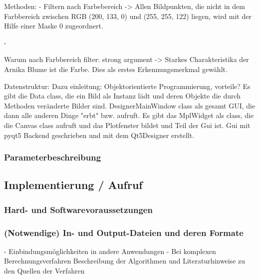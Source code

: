 Methoden: 
- Filtern nach Farbebereich ->
Allen Bildpunkten, die nicht in dem Farbbereich zwischen RGB (200, 133, 0) und (255, 255, 122) liegen, wird mit der Hilfe einer Maske 0 zugeordnert. 

- 

Warum nach Farbbereich filter:
strong argument -> Starkes Charakteristika der Arnika Blume ist die Farbe. Dies als erstes Erkennungsmerkmal gewählt.


Datenstruktur:
Dazu einleitung: Objektorientierte Programmierung, vorteile?
Es gibt die Data class, die ein Bild als Instanz lädt und deren Objekte die durch Methoden veränderte Bilder sind. 
DesignerMainWindow class als gesamt GUI, die dann alle anderen Dinge "erbt" bzw. aufruft.
Es gibt das MplWidget als class, die die Canvas class aufruft und das Plotfenster bildet und Teil der Gui ist. 
Gui mit pyqt5 Backend geschrieben und mit dem Qt5Designer erstellt.

\subsubsection{Parameterbeschreibung}


\subsection{Implementierung / Aufruf}    




\subsubsection{Hard- und Softwarevoraussetzungen}
\subsubsection{(Notwendige) In- und Output-Dateien und deren Formate}



- Einbindungsmöglichkeiten in andere Anwendungen
- Bei komplexen Berechnungsverfahren Beschreibung der Algorithmen und Literaturhinweise zu den Quellen der Verfahren


    
